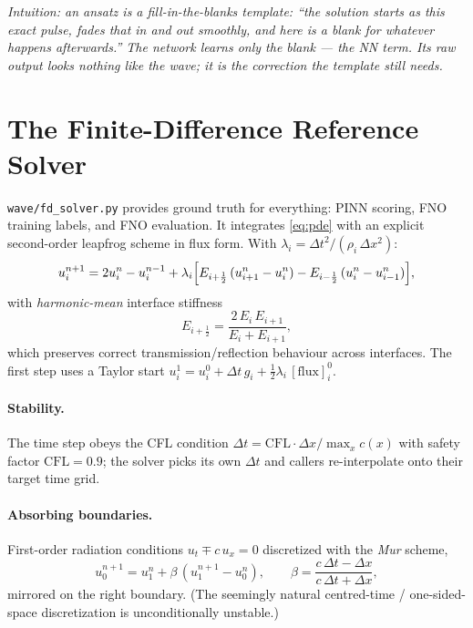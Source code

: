 \documentclass[11pt,a4paper]{article}
\newcommand{\intuition}[1]{\par\smallskip\noindent\textit{\color{inkgray}Intuition: #1}\par\smallskip}
\begin{document}
\intuition{an ansatz is a fill-in-the-blanks template: ``the solution starts as
this exact pulse, fades that in and out smoothly, and here is a blank for
whatever happens afterwards.'' The network learns only the blank ---
the \emph{NN term}. Its raw output looks nothing like the wave; it is the
correction the template still needs.}

\section{The Finite-Difference Reference Solver}
\label{sec:fd}

\texttt{wave/fd\_solver.py} provides ground truth for everything: PINN scoring,
FNO training labels, and FNO evaluation. It integrates \eqref{eq:pde} with an
explicit second-order leapfrog scheme in flux form. With
$\lambda_i = \Delta t^2 / (\rho_i\,\Delta x^2)$:
\begin{equation}
  u_i^{n+1} = 2u_i^n - u_i^{n-1}
  + \lambda_i \Bigl[ E_{i+\frac12}\,(u_{i+1}^n - u_i^n) - E_{i-\frac12}\,(u_i^n - u_{i-1}^n) \Bigr],
\end{equation}
with \emph{harmonic-mean} interface stiffness
\begin{equation}
  E_{i+\frac12} = \frac{2\,E_i\,E_{i+1}}{E_i + E_{i+1}},
\end{equation}
which preserves correct transmission/reflection behaviour across interfaces.
The first step uses a Taylor start
$u_i^1 = u_i^0 + \Delta t\, g_i + \tfrac12 \lambda_i\,[\text{flux}]_i^0$.

\paragraph{Stability.} The time step obeys the CFL condition
$\Delta t = \mathrm{CFL} \cdot \Delta x / \max_x c(x)$ with safety factor
$\mathrm{CFL} = 0.9$; the solver picks its own $\Delta t$ and callers
re-interpolate onto their target time grid.

\paragraph{Absorbing boundaries.} First-order radiation conditions
$u_t \mp c\,u_x = 0$ discretized with the \emph{Mur} scheme,
\begin{equation}
  u_0^{n+1} = u_1^{n} + \beta\,(u_1^{n+1} - u_0^{n}), \qquad
  \beta = \frac{c\,\Delta t - \Delta x}{c\,\Delta t + \Delta x},
\end{equation}
mirrored on the right boundary. (The seemingly natural centred-time /
one-sided-space discretization is unconditionally unstable.)
\end{document}
